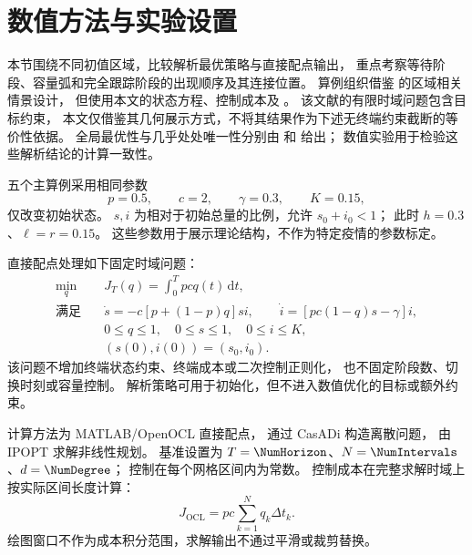 \section{数值方法与实验设置}
\label{sec:numerical-method}

本节围绕不同初值区域，比较解析最优策略与直接配点输出，
重点考察等待阶段、容量弧和完全跟踪阶段的出现顺序及其连接位置。
算例组织借鉴 \citet[第6节]{AvramFreddiGoreac2022} 的区域相关情景设计，
但使用本文的状态方程、控制成本及
。
该文献的有限时域问题包含目标约束，
本文仅借鉴其几何展示方式，不将其结果作为下述无终端约束截断的等价性依据。
全局最优性与几乎处处唯一性分别由
和
给出；
数值实验用于检验这些解析结论的计算一致性。

五个主算例采用相同参数
\begin{equation}
 p=0.5,\qquad c=2,\qquad\gamma=0.3,\qquad K=0.15,
 \label{eq:numerical-common-parameters}
\end{equation}
仅改变初始状态。
$s,i$ 为相对于初始总量的比例，允许 $s_0+i_0<1$；
此时 $h=0.3$、$\ell=r=0.15$。
这些参数用于展示理论结构，不作为特定疫情的参数标定。

直接配点处理如下固定时域问题：
\begin{equation}
\begin{aligned}
 \min_q\quad &J_T(q)=\int_0^T pcq(t)\,\mathrm dt,\\
 \text{满足}\quad
 &\dot s=-c[p+(1-p)q]si,\qquad
 \dot i=[pc(1-q)s-\gamma]i,\\
 &0\le q\le1,\quad 0\le s\le1,\quad0\le i\le K,\\
 &(s(0),i(0))=(s_0,i_0).
\end{aligned}
\label{eq:numerical-ocp}
\end{equation}
该问题不增加终端状态约束、终端成本或二次控制正则化，
也不固定阶段数、切换时刻或容量控制。
解析策略可用于初始化，但不进入数值优化的目标或额外约束。

计算方法为 MATLAB/OpenOCL 直接配点\citep{Koenemann2019OpenOCL}，
通过 CasADi\citep{Andersson2019CasADi} 构造离散问题，
由 IPOPT 求解非线性规划\citep{WachterBiegler2006}。
基准设置为 $T=\NumHorizon$、$N=\NumIntervals$、$d=\NumDegree$；
控制在每个网格区间内为常数。
\NumMeshDetails
控制成本在完整求解时域上按实际区间长度计算：
\begin{equation}
 J_{\mathrm{OCL}}=pc\sum_{k=1}^{N}q_k\Delta t_k.
 \label{eq:numerical-cost-sum}
\end{equation}
绘图窗口不作为成本积分范围，求解输出不通过平滑或裁剪替换。

